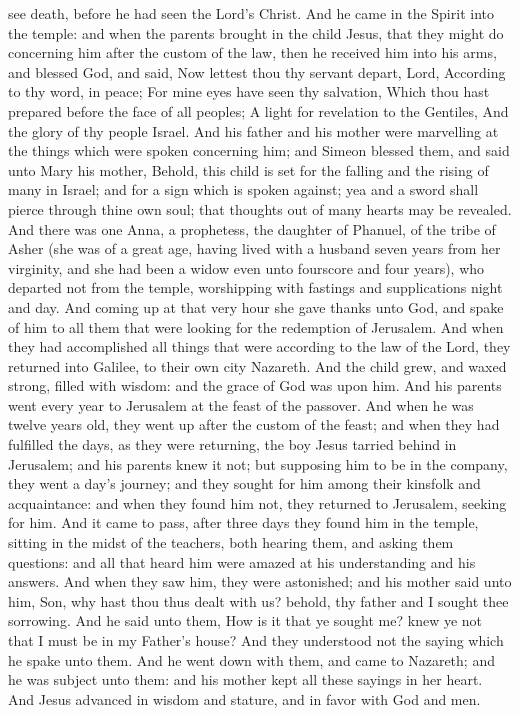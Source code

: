 see death, before he had seen the Lord’s Christ. And he came in the Spirit into the temple: and when the parents brought in the child Jesus, that they might do concerning him after the custom of the law, then he received him into his arms, and blessed God, and said,  Now lettest thou thy servant depart, Lord, According to thy word, in peace;  For mine eyes have seen thy salvation,  Which thou hast prepared before the face of all peoples;  A light for revelation to the Gentiles, And the glory of thy people Israel.  And his father and his mother were marvelling at the things which were spoken concerning him; and Simeon blessed them, and said unto Mary his mother, Behold, this child is set for the falling and the rising of many in Israel; and for a sign which is spoken against; yea and a sword shall pierce through thine own soul; that thoughts out of many hearts may be revealed. And there was one Anna, a prophetess, the daughter of Phanuel, of the tribe of Asher (she was of a great age, having lived with a husband seven years from her virginity, and she had been a widow even unto fourscore and four years), who departed not from the temple, worshipping with fastings and supplications night and day. And coming up at that very hour she gave thanks unto God, and spake of him to all them that were looking for the redemption of Jerusalem. And when they had accomplished all things that were according to the law of the Lord, they returned into Galilee, to their own city Nazareth.  And the child grew, and waxed strong, filled with wisdom: and the grace of God was upon him.  And his parents went every year to Jerusalem at the feast of the passover. And when he was twelve years old, they went up after the custom of the feast; and when they had fulfilled the days, as they were returning, the boy Jesus tarried behind in Jerusalem; and his parents knew it not; but supposing him to be in the company, they went a day’s journey; and they sought for him among their kinsfolk and acquaintance: and when they found him not, they returned to Jerusalem, seeking for him. And it came to pass, after three days they found him in the temple, sitting in the midst of the teachers, both hearing them, and asking them questions: and all that heard him were amazed at his understanding and his answers. And when they saw him, they were astonished; and his mother said unto him, Son, why hast thou thus dealt with us? behold, thy father and I sought thee sorrowing. And he said unto them, How is it that ye sought me? knew ye not that I must be in my Father’s house? And they understood not the saying which he spake unto them. And he went down with them, and came to Nazareth; and he was subject unto them: and his mother kept all these sayings in her heart.  And Jesus advanced in wisdom and stature, and in favor with God and men. 

